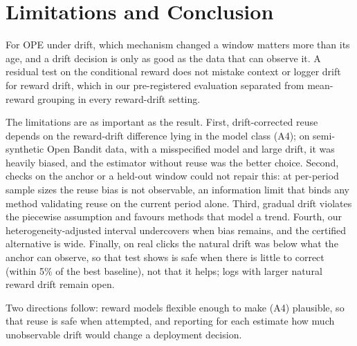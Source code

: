 \section{Limitations and Conclusion}\label{sec:conclusion}

For OPE under drift, which mechanism changed a window matters more than its age, and a drift
decision is only as good as the data that can observe it. A residual test on the conditional
reward does not mistake context or logger drift for reward drift, which in our pre-registered
evaluation separated \odrift{} from mean-reward grouping in every reward-drift setting.

The limitations are as important as the result. First, drift-corrected reuse depends on the
reward-drift difference lying in the model class (A4); on semi-synthetic Open Bandit data,
with a misspecified model and large drift, it was heavily biased, and the estimator without
reuse was the better choice. Second, checks on the anchor or a held-out window could not repair this: at per-period
sample sizes the reuse bias is not observable, an information limit that binds any method
validating reuse on the current period alone. Third, gradual drift
violates the piecewise assumption and favours methods that model a trend. Fourth, our
heterogeneity-adjusted interval undercovers when bias remains, and the certified alternative
is wide. Finally, on real clicks the natural drift was below what the anchor can observe,
so that test shows \odrift{} is safe when there is little to correct (within 5\% of the best
baseline), not that it helps; logs with larger natural reward drift remain open.

Two directions follow: reward models flexible enough to make (A4) plausible, so that reuse is
safe when attempted, and reporting for each estimate how much unobservable drift would change
a deployment decision.
